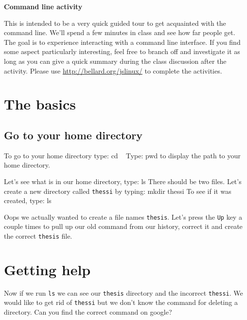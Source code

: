 \documentclass[12pt]{article}
\newenvironment{cmd}{\verbatim}{\endverbatim\vspace{3pt}}
\begin{document}
\begin{center}
\Large{\textbf{Command line activity}}\\
\end{center}

This is intended to be a very quick guided tour to get acquainted with the command line. We'll spend a few minutes in class and see how far people get. The goal is to experience interacting with a command line interface. If you find some aspect particularly interesting, feel free to branch off and investigate it as long as you can give a quick summary during the class discussion after the activity. Please use \url{http://bellard.org/jslinux/} to complete the activities.


\section{The basics}
\subsection{Go to your home directory}
To go to your home directory type:
\begin{cmd}
  cd ~
\end{cmd}
Type:
\begin{cmd}
  pwd
\end{cmd}
to display the path to your home directory. %

Let's see what is in our home directory, type:
\begin{cmd}
  ls
\end{cmd}
There should be two files.  Let's create a new directory called \texttt{thessi} by typing:
\begin{cmd}
  mkdir thessi
\end{cmd}
To see if it was created, type:
\begin{cmd}
  ls
\end{cmd}

Oops we actually wanted to create a file names \texttt{thesis}. Let's press the \texttt{Up} key a couple times to pull up our old command from our history, correct it and create the correct \texttt{thesis} file.

\section{Getting help}
Now if we run \texttt{ls} we can see our \texttt{thesis} directory and the incorrect \texttt{thessi}. We would like to get rid of \texttt{thessi} but we don't know the command for deleting a directory. Can you find the correct command on google?
\vspace{.4in}
\end{document}

